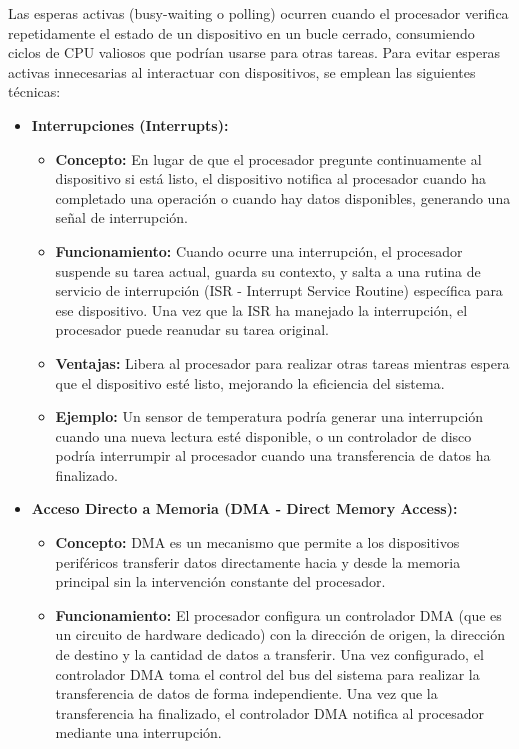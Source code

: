 \documentclass[12pt]{article}
\begin{document}
Las esperas activas (busy-waiting o polling) ocurren cuando el procesador verifica repetidamente el estado de un dispositivo en un bucle cerrado, consumiendo ciclos de CPU valiosos que podrían usarse para otras tareas. Para evitar esperas activas innecesarias al interactuar con dispositivos, se emplean las siguientes técnicas:

\begin{itemize}
    \item \textbf{Interrupciones (Interrupts):}
    \begin{itemize}
        \item \textbf{Concepto:} En lugar de que el procesador pregunte continuamente al dispositivo si está listo, el dispositivo notifica al procesador cuando ha completado una operación o cuando hay datos disponibles, generando una señal de interrupción.
        \item \textbf{Funcionamiento:} Cuando ocurre una interrupción, el procesador suspende su tarea actual, guarda su contexto, y salta a una rutina de servicio de interrupción (ISR - Interrupt Service Routine) específica para ese dispositivo. Una vez que la ISR ha manejado la interrupción, el procesador puede reanudar su tarea original.
        \item \textbf{Ventajas:} Libera al procesador para realizar otras tareas mientras espera que el dispositivo esté listo, mejorando la eficiencia del sistema.
        \item \textbf{Ejemplo:} Un sensor de temperatura podría generar una interrupción cuando una nueva lectura esté disponible, o un controlador de disco podría interrumpir al procesador cuando una transferencia de datos ha finalizado.
    \end{itemize}
    \item \textbf{Acceso Directo a Memoria (DMA - Direct Memory Access):}
    \begin{itemize}
        \item \textbf{Concepto:} DMA es un mecanismo que permite a los dispositivos periféricos transferir datos directamente hacia y desde la memoria principal sin la intervención constante del procesador.
        \item \textbf{Funcionamiento:} El procesador configura un controlador DMA (que es un circuito de hardware dedicado) con la dirección de origen, la dirección de destino y la cantidad de datos a transferir. Una vez configurado, el controlador DMA toma el control del bus del sistema para realizar la transferencia de datos de forma independiente. Una vez que la transferencia ha finalizado, el controlador DMA notifica al procesador mediante una interrupción.

\end{itemize}
\end{itemize}
\end{document}
